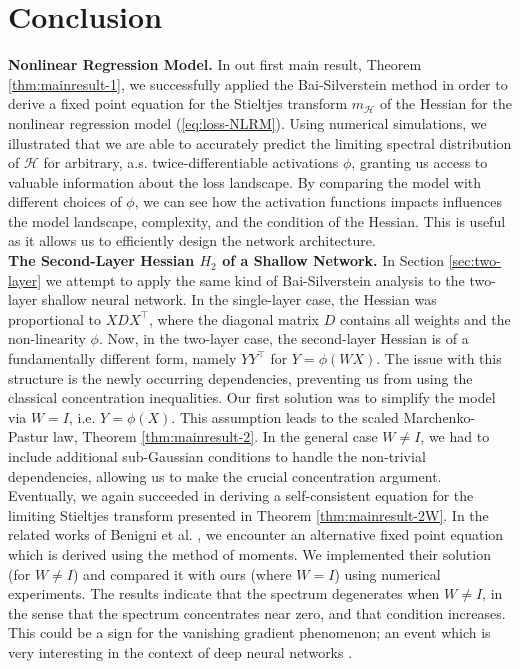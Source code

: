 \documentclass{article}
\begin{document}
\section{Conclusion}
\textbf{Nonlinear Regression Model.} In out first main result, Theorem \ref{thm:mainresult-1}, we successfully applied the Bai-Silverstein method in order to derive a fixed point equation for the Stieltjes transform $m_{\mathcal{H}}$ of the Hessian for the nonlinear regression model (\ref{eq:loss-NLRM}). Using numerical simulations, we illustrated that we are able to accurately predict the limiting spectral distribution of $\mathcal{H}$ for arbitrary, a.s. twice-differentiable activations $\phi$, granting us access to valuable information about the loss landscape. By comparing the model with different choices of $\phi$, we can see how the activation functions impacts influences the model landscape, complexity, and the condition of the Hessian. This is useful as it allows us to efficiently design the network architecture.
\bigskip
\bigskip
\\
\textbf{The Second-Layer Hessian $H_2$ of a Shallow Network.} In Section \ref{sec:two-layer} we attempt to apply the same kind of Bai-Silverstein analysis to the two-layer shallow neural network. In the single-layer case, the Hessian was proportional to $XDX^\top$, where the diagonal matrix $D$ contains all weights and the non-linearity $\phi$. Now, in the two-layer case, the second-layer Hessian is of a fundamentally different form, namely $YY^\top$ for $Y=\phi(WX)$. The issue with this structure is the newly occurring dependencies, preventing us from using the classical concentration inequalities. Our first solution was to simplify the model via $W=I$, i.e. $Y=\phi(X)$. This assumption leads to the scaled Marchenko-Pastur law, Theorem \ref{thm:mainresult-2}. In the general case $W\neq I$, we had to include additional sub-Gaussian conditions to handle the non-trivial dependencies, allowing us to make the crucial concentration argument. Eventually, we again succeeded in deriving a self-consistent equation for the limiting Stieltjes transform presented in Theorem \ref{thm:mainresult-2W}. In the related works of Benigni et al. \cite{benigni, piccolo}, we encounter an alternative fixed point equation which is derived using the method of moments. We implemented their solution (for $W\neq I$) and compared it with ours (where $W=I$) using numerical experiments. The results indicate that the spectrum degenerates when $W\neq I$, in the sense that the spectrum concentrates near zero, and that condition increases. This could be a sign for the vanishing gradient phenomenon; an event which is very interesting in the context of deep neural networks \cite{orvieto}.
\end{document}
